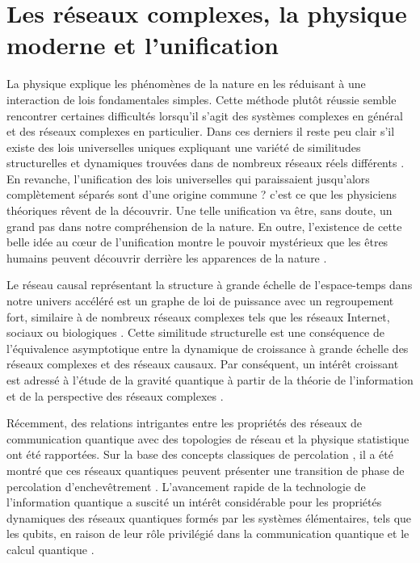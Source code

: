 \section{Les réseaux complexes, la physique moderne et l'unification}
La physique explique les phénomènes de la nature en les réduisant à une interaction de lois fondamentales simples. Cette méthode plutôt réussie semble rencontrer certaines difficultés lorsqu'il s'agit des systèmes complexes en général et des réseaux complexes en particulier. Dans ces derniers il reste peu clair s'il existe des lois universelles uniques expliquant une variété de similitudes structurelles et dynamiques trouvées dans de nombreux réseaux réels différents  \cite{K-al2012,BS2009,La-al2009,Li-al2011}. En revanche, l'\textsf{unification} des lois universelles qui paraissaient jusqu'alors complètement séparés sont d'une  origine commune ? c'est ce que les physiciens théoriques rêvent de la découvrir. Une telle  \textsf{unification}
va \^{e}tre, sans doute, un grand pas dans notre compréhension de la nature. En outre, l'existence de cette belle idée au cœur de l'unification montre le pouvoir mystérieux que les êtres humains peuvent découvrir derrière les apparences de la nature \cite{Sm1997}.

Le réseau causal représentant la structure à grande échelle de l'espace-temps dans notre univers accéléré est un graphe de loi de puissance avec un regroupement fort, similaire à de nombreux réseaux complexes tels que les réseaux Internet, sociaux ou biologiques \cite{K-al2012}. Cette similitude structurelle est une conséquence de l'équivalence asymptotique entre la dynamique
de croissance à grande échelle des réseaux complexes et des réseaux causaux. Par conséquent, un intérêt croissant est adressé à l'étude de la gravité quantique à partir de la théorie de l'information et de la perspective des réseaux complexes \cite{Tr2015,Bi-al2015}.

Récemment, des relations intrigantes entre les propriétés des réseaux de communication quantique avec des topologies de réseau et la physique statistique ont été rapportées. Sur la base des concepts classiques de percolation \cite{BR2006}, il a été montré que ces réseaux quantiques peuvent présenter une transition de phase de percolation d'enchevêtrement \cite{Ac-al2007,Sa1999}.
L'avancement rapide de la technologie de l'information quantique a suscité un intérêt considérable pour les propriétés dynamiques des réseaux quantiques formés par les systèmes élémentaires, tels que les qubits, en raison de leur rôle privilégié dans la communication quantique et le calcul quantique \cite{J-al2015,BG2007,MC2000}.\\

